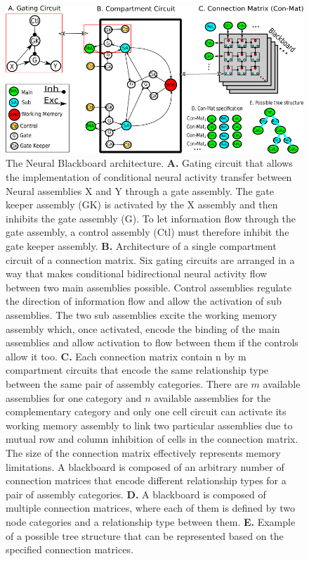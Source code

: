 \documentclass[10pt]{article}
\begin{document}
\begin{figure}[h!]
  \begin{center}
    \includegraphics[width=1.00\columnwidth]{figures/gating_circuit3/gating_circuit3}
    \caption{The Neural Blackboard architecture.
      \textbf{A.} Gating circuit that allows the implementation of conditional neural activity transfer between Neural assemblies X and Y through a gate assembly.
      The gate keeper assembly (GK) is activated by the X assembly and then inhibits the gate assembly (G).
      To let information flow through the gate assembly, a control assembly (Ctl) must therefore inhibit the gate keeper assembly.
      \textbf{B.} Architecture of a single compartment circuit of a connection matrix.
      Six gating circuits are arranged in a way that makes conditional bidirectional neural activity flow between two main assemblies possible.
      Control assemblies regulate the direction of information flow and allow the activation of sub assemblies.
      The two sub assemblies excite the working memory assembly which, once activated, encode the binding of the main assemblies and allow activation to flow between them if the controls allow it too.
      \textbf{C.} Each connection matrix contain n by m compartment circuits that encode the same relationship type between the same pair of assembly categories.
      There are $m$ available assemblies for one category and $n$ available assemblies for the complementary category and only one cell circuit can activate its working memory assembly to link two particular assemblies due to mutual row and column inhibition of cells in the connection matrix.
      The size of the connection matrix effectively represents memory limitations.
      A blackboard is composed of an arbitrary number of connection matrices that encode different relationship types for a pair of assembly categories.
      \textbf{D.} A blackboard is composed of multiple connection matrices, where each of them is defined by two node categories and a relationship type between them.
      \textbf{E.} Example of a possible tree structure that can be represented based on the specified connection matrices. }
      \label{Blackboard}
  \end{center}
\end{figure}
\end{document}
